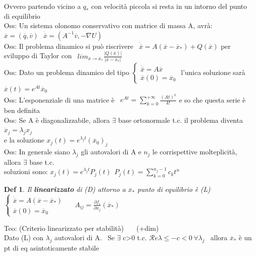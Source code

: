 \documentclass{article}
\theoremstyle{unnumbered}
\newtheorem* {theoremT}{Def}
\theoremstyle{unnumbered1}
\newenvironment{defi}{\begin{gBox}\begin{theoremT}}{\end{theoremT}\end{gBox}}
\begin{document}
\phantom{Oss: }Ovvero partendo vicino a $q_*$ con velocità piccola si resta in un intorno del punto di equilibrio\\
%
Oss: Un sistema olonomo conservativo con matrice di massa A, avrà: \ $\overline{x}=(\overline{q},\overline{v}) \ \ \ \dot{\overline{x}}=(A^{-1}\overline{v},-\nabla U)$ \\  %
%
%
%
Oss: Il problema dinamico si può riscrivere \ $\dot{\overline{x}}=A(\overline{x}-\overline{x}_*)+Q(\overline{x})$ per sviluppo di Taylor con \ $lim_{\overline{x}\rightarrow\overline{x}_*}\frac{|Q(\overline{x})|}{|\overline{x}-\overline{x}_*|}$  \\
%
Oss: Dato un problema dinamico del tipo $\begin{cases}\dot{\overline{x}}=A\overline{x} \\ \overline{x}(0)=\overline{x}_0\end{cases}$ l'unica soluzione sarà \ $\overline{x}(t)=e^{At}\overline{x}_0$\\
%
Oss: L'esponenziale di una matrice è \ $e^{At}=\sum_{k=0}^{+\infty}\frac{(At)^k}{k!}$ e so che questa serie è ben definita \\
%
Oss: Se A è diagonalizzabile, allora $\exists$ base ortonormale t.c. il problema diventa $\dot{x}_j=\lambda_jx_j$\\
\phantom{Oss: }e la soluzione $x_j(t)=e^{\lambda_jt}(\overline{x}_0)_j$\\
%
Oss: In generale siano $\lambda_j$ gli autovalori di A e $n_j$ le corrispettive molteplicità, allora $\exists$ base t.c.\\
\phantom{Oss: }soluzioni sono: $x_j(t)=e^{\lambda_jt}P_j(t) \ \ P_j(t)=\sum_{k=0}^{n_j-1}c_kt^n$\\
%
%
%
\begin{defi}
Il \textbf{linearizzato} di (D) attorno a $\overline{x}_*$ punto di equilibrio è (L) \ $\begin{cases}\dot{\overline{x}}=A(\overline{x}-\overline{x}_*) \\ \overline{x}(0)=\overline{x}_0\end{cases}$ \ \ $A_{ij}=\frac{\partial f_i}{\partial x_j}(\overline{x}_*)$
\end{defi}
%
Teo: (Criterio linearizzato per stabilità) \ \ \ (+dim)\\
Dato (L) con $\lambda_j$ autovalori di A. \ Se $\exists$ c>0 t.c. $\mathcal{R}e\lambda \le -c <0 \ \forall \lambda_j$ \ allora $\overline{x}_*$ è un pt di eq asintoticamente stabile
\end{document}
